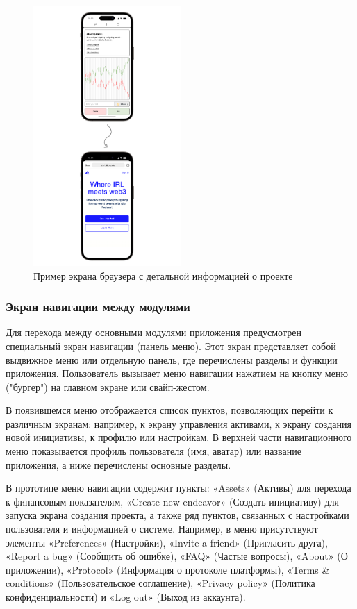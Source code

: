 \documentclass[
    candidate, %
    subf, %
    dotsinheaders=false,
]{disser}
\begin{document}
\begin{figure}[h]
  \centering
  \includegraphics[width=0.5\textwidth]{./assets/app-browser.png}
  \caption{Пример экрана браузера с детальной информацией о проекте}
  \label{fig:app-browser}
\end{figure}


\subsubsection{Экран навигации между модулями}

Для перехода между основными модулями приложения предусмотрен специальный экран навигации (панель меню). Этот экран представляет собой выдвижное меню или отдельную панель, где перечислены разделы и функции приложения. Пользователь вызывает меню навигации нажатием на кнопку меню ("бургер") на главном экране или свайп-жестом.

В появившемся меню отображается список пунктов, позволяющих перейти к различным экранам: например, к экрану управления активами, к экрану создания новой инициативы, к профилю или настройкам. В верхней части навигационного меню показывается профиль пользователя (имя, аватар) или название приложения, а ниже перечислены основные разделы.

В прототипе меню навигации содержит пункты: «Assets» (Активы) для перехода к финансовым показателям, «Create new endeavor» (Создать инициативу) для запуска экрана создания проекта, а также ряд пунктов, связанных с настройками пользователя и информацией о системе. Например, в меню присутствуют элементы «Preferences» (Настройки), «Invite a friend» (Пригласить друга), «Report a bug» (Сообщить об ошибке), «FAQ» (Частые вопросы), «About» (О приложении), «Protocol» (Информация о протоколе платформы), «Terms \& conditions» (Пользовательское соглашение), «Privacy policy» (Политика конфиденциальности) и «Log out» (Выход из аккаунта).
\end{document}
